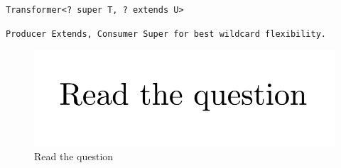 \documentclass[5pt, portrait]{article}
\begin{document}
\begin{verbatim}
Transformer<? super T, ? extends U>
\end{verbatim}
\begin{verbatim}
Producer Extends, Consumer Super for best wildcard flexibility.
\end{verbatim}

\begin{figure}
    \centering
    \includegraphics[width=1\linewidth]{Screenshot 2024-11-09 132152.png}
    \caption{Read the question}
\end{figure}
\end{document}
